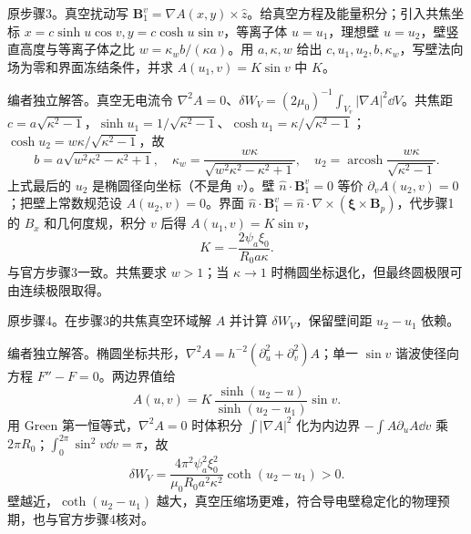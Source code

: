 \begin{exercise}\label{ex:hist03-mhd-3}
原步骤3。真空扰动写 $\mathbf B_1^v=\nabla A(x,y)\times\hat z$。给真空方程及能量积分；引入共焦坐标 $x=c\sinh u\cos v,y=c\cosh u\sin v$，等离子体 $u=u_1$，理想壁 $u=u_2$，壁竖直高度与等离子体之比 $w=\kappa_wb/(\kappa a)$。用 $a,\kappa,w$ 给出 $c,u_1,u_2,b,\kappa_w$，写壁法向场为零和界面冻结条件，并求 $A(u_1,v)=K\sin v$ 中 $K$。
\end{exercise}
\begin{solution}
编者独立解答。真空无电流令 $\nabla^2A=0$、$\delta W_V=(2\mu_0)^{-1}\int_{V_v}|\nabla A|^2\dd V$。共焦距 $c=a\sqrt{\kappa^2-1}$，$\sinh u_1=1/\sqrt{\kappa^2-1}$、$\cosh u_1=\kappa/\sqrt{\kappa^2-1}$；$\cosh u_2=w\kappa/\sqrt{\kappa^2-1}$，故
\begin{equation}b=a\sqrt{w^2\kappa^2-\kappa^2+1},\quad
\kappa_w=\frac{w\kappa}{\sqrt{w^2\kappa^2-\kappa^2+1}},\quad
u_2=\operatorname{arcosh}\!\frac{w\kappa}{\sqrt{\kappa^2-1}}.\end{equation}
上式最后的 $u_2$ 是椭圆径向坐标（不是角 $v$）。壁 $\hat n\cdot\mathbf B_1^v=0$ 等价 $\partial_v A(u_2,v)=0$；把壁上常数规范设 $A(u_2,v)=0$。界面 $\hat n\cdot\mathbf B_1^v=\hat n\cdot\nabla\times(\boldsymbol\xi\times\mathbf B_p)$，代步骤1的 $B_x$ 和几何度规，积分 $v$ 后得 $A(u_1,v)=K\sin v$，
\begin{equation}K=-\frac{2\psi_a\xi_0}{R_0a\kappa}.
\end{equation}
与官方步骤3一致。共焦要求 $w>1$；当 $\kappa\to1$ 时椭圆坐标退化，但最终圆极限可由连续极限取得。
\end{solution}

\begin{exercise}\label{ex:hist03-mhd-4}
原步骤4。在步骤3的共焦真空环域解 $A$ 并计算 $\delta W_V$，保留壁间距 $u_2-u_1$ 依赖。
\end{exercise}
\begin{solution}
编者独立解答。椭圆坐标共形，$\nabla^2A=h^{-2}(\partial_u^2+\partial_v^2)A$；单一 $\sin v$ 谐波使径向方程 $F''-F=0$。两边界值给
\begin{equation}A(u,v)=K\,\frac{\sinh(u_2-u)}{\sinh(u_2-u_1)}\sin v.
\end{equation}
用 Green 第一恒等式，$\nabla^2A=0$ 时体积分 $\int|\nabla A|^2$ 化为内边界 $-\int A\partial_uA\dd v$ 乘 $2\pi R_0$；$\int_0^{2\pi}\sin^2v\dd v=\pi$，故
\begin{equation}\delta W_V=\frac{4\pi^2\psi_a^2\xi_0^2}{\mu_0R_0a^2\kappa^2}\coth(u_2-u_1)>0.
\end{equation}
壁越近，$\coth(u_2-u_1)$ 越大，真空压缩场更难，符合导电壁稳定化的物理预期，也与官方步骤4核对。
\end{solution}

